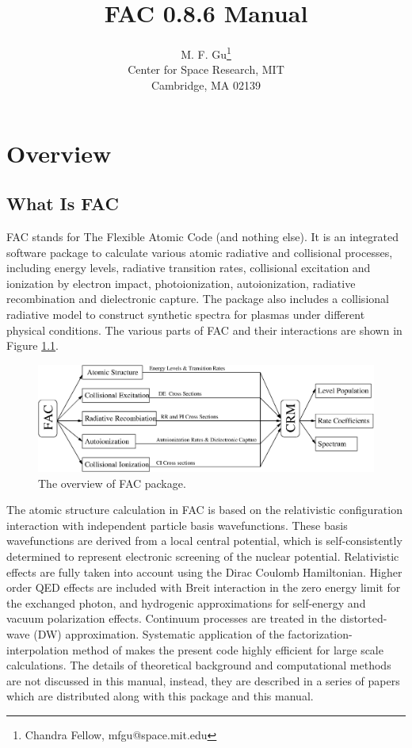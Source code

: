 \documentclass[twoside,letterpaper]{refrep}
\newcommand{\facversion}{{0.8.6}\xspace}
\begin{document}
\title{FAC \facversion Manual}
\author{M. F. Gu\thanks{Chandra Fellow,  mfgu@space.mit.edu} \\
Center for Space Research, MIT \\ Cambridge, MA 02139}

\date{}

\maketitle

\tableofcontents

\chapter{Overview}
\label{cha:overview}

\section{What Is FAC}
FAC stands for The Flexible Atomic Code (and nothing else). It is an
integrated software package to calculate various atomic radiative and
collisional processes, including energy levels, radiative transition rates,
collisional excitation and 
ionization by electron impact, photoionization, autoionization, radiative
recombination and dielectronic capture. The package also includes a
collisional radiative model to construct synthetic spectra for plasmas under
different physical conditions. The various parts of FAC and their
interactions are shown in Figure \ref{fig:flow}. 

\begin{figure}
\includegraphics[width=6in]{flow.eps}
\caption{\label{fig:flow}The overview of FAC package.}
\end{figure}

The atomic structure calculation in FAC is based on the relativistic
configuration interaction with independent particle basis wavefunctions. These
basis wavefunctions are derived from a local central potential, which is
self-consistently determined to represent electronic screening of the nuclear
potential. Relativistic effects are fully taken into account using the Dirac
Coulomb Hamiltonian. Higher order QED effects are included with Breit
interaction in the zero energy limit for the exchanged photon, and hydrogenic
approximations for self-energy and vacuum polarization effects. 
Continuum processes are treated
in the distorted-wave (DW) approximation. Systematic application of the
factorization-interpolation method of \citet{barshalom88} makes the present
code highly efficient for large scale calculations. The details of theoretical
background and computational methods are not discussed in this manual,
instead, they are described in a series of papers which are distributed along
with this package and this manual.
\end{document}
